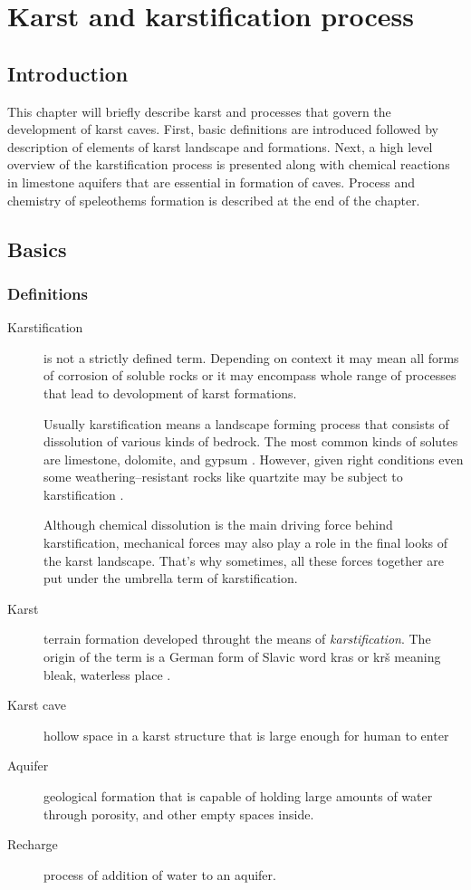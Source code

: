\chapter{Karst and karstification process}
\label{chap:karstification}
\section{Introduction}
This chapter will briefly describe karst and processes that govern the
development of karst caves. First, basic definitions are introduced followed by
description of elements of karst landscape and formations. Next, a high level
overview of the karstification process is presented along with chemical reactions
in limestone aquifers that are essential in formation of caves. Process and
chemistry of speleothems formation is described at the end of the chapter.
\section{Basics}

\subsection{Definitions}
\begin{description}
  \item[Karstification]
    is not a strictly defined term. Depending on context it may
    mean all forms of corrosion of soluble rocks or it may encompass whole range of
    processes that lead to devolopment of karst formations.
    
    Usually karstification means a landscape forming process that consists of
    dissolution of various kinds of bedrock. The most common kinds of solutes
    are limestone, dolomite, and gypsum \parencite{karstglossary}. However,
    given right conditions even some weathering--resistant rocks like quartzite
    may be subject to karstification \parencite{migon2010}.
    
    Although chemical dissolution is the main driving force behind karstification,
    mechanical forces may also play a role in the final looks of the karst landscape.
    That's why sometimes, all these forces together are put under the umbrella term
    of karstification.

  \item[Karst]
    terrain formation developed throught the means of
    \emph{karstification}. The origin of the term is a German form of Slavic word
    kras or krš meaning bleak, waterless place \parencite{karstglossary}.
  \item[Karst cave]
    hollow space in a karst structure that is large enough for human to enter
    \parencite{hill1997cave}
  \item[Aquifer]
    geological formation that is capable of holding large amounts of water
    through porosity, and other empty spaces inside.
  \item[Recharge]
    process of addition of water to an aquifer.
\end{description}
